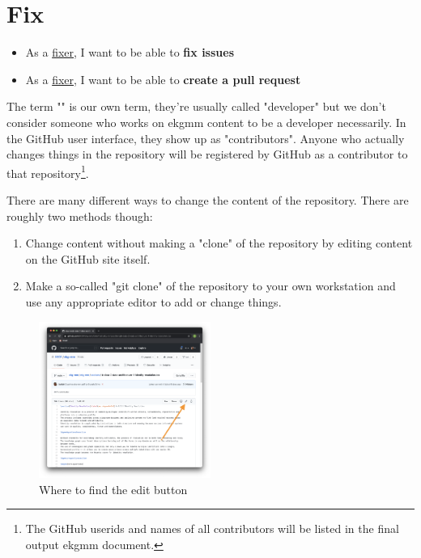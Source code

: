 \pagebreak
\section{Fix}
\label{sec:ekg-mm-process-fix}

\begin{tcolorbox}[colback=secondary!5,colframe=secondary!80,title=\textbf{User Stories}]
    \begin{itemize}[leftmargin=1em]
        \item As a \underline{fixer}, I want to be able to \textbf{fix issues}
        \item As a \underline{fixer}, I want to be able to \textbf{create a pull request}
    \end{itemize}
\end{tcolorbox}

The term "" is our own term, they’re usually called "developer" but
we don’t consider someone who works on \gls{ekgmm} content to be a developer necessarily.
In the GitHub user interface, they show up as "contributors".
Anyone who actually changes things in the repository will be registered by GitHub as 
a contributor to that repository\footnote{The GitHub userids and names of all 
contributors will be listed in the final output \gls{ekgmm} document.}.

There are many different ways to change the content of the repository. 
There are roughly two methods though:

\begin{enumerate}[label=(\Alph*)]
    \item Change content without making a "clone" of the repository by editing content on the GitHub site itself.
    \item Make a so-called "git clone" of the repository to your own workstation and use any appropriate editor to add or change things.
\end{enumerate}

%
%
\begin{figure}
    \vspace{-12pt}
    \begin{center}
        \includegraphics[width=0.50\textwidth]{../images/ekgmm-process-edit-content.png}
    \end{center}
    \caption{Where to find the edit button}
    \label{fig:ekgmm-process-edit-content}
\end{figure}

